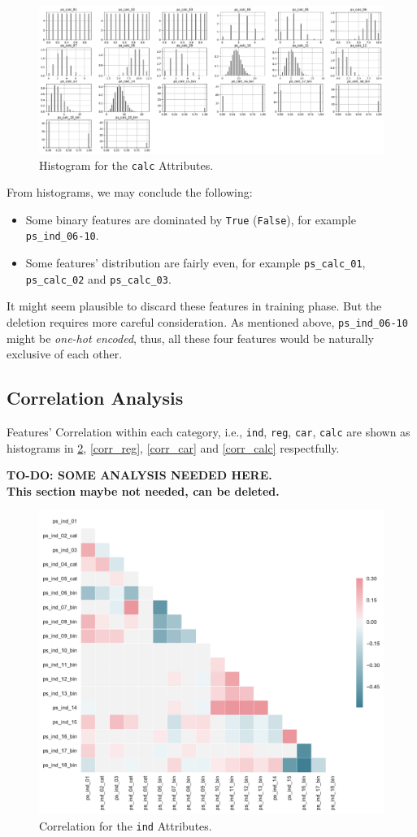 \documentclass{standalone}
\begin{document}
\begin{figure}[!ht]
\centering
\includegraphics[width=\textwidth]{fig/calc_col.pdf}
\caption{Histogram for the \lstinline{calc} Attributes.}
\label{hist_calc}
\end{figure}

From histograms, we may conclude the following:
\begin{itemize}
\item Some binary features are dominated by \lstinline{True} (\lstinline{False}), for example \lstinline{ps_ind_06-10}.
\item Some features' distribution are fairly even, for example \lstinline{ps_calc_01}, \lstinline{ps_calc_02} and \lstinline{ps_calc_03}.
\end{itemize}

It might seem plausible to discard these features in training phase. But the deletion requires more careful consideration. As mentioned above, \lstinline{ps_ind_06-10} might be \emph{one-hot encoded}, thus, all these four features would be naturally exclusive of each other.

\subsection{Correlation Analysis}

Features' Correlation within each category, i.e., \lstinline{ind}, \lstinline{reg}, \lstinline{car}, \lstinline{calc} are shown as histograms in \cref{corr_ind}, \cref{corr_reg}, \cref{corr_car} and \cref{corr_calc} respectfully.

\textbf{TO-DO: SOME ANALYSIS NEEDED HERE. \\This section maybe not needed, can be deleted.}

\begin{figure}[!t]
\centering
\includegraphics[width=.5\textwidth]{fig/corr_ind_col.pdf}
\caption{Correlation for the \lstinline{ind} Attributes.}
\label{corr_ind}
\end{figure}
\end{document}
